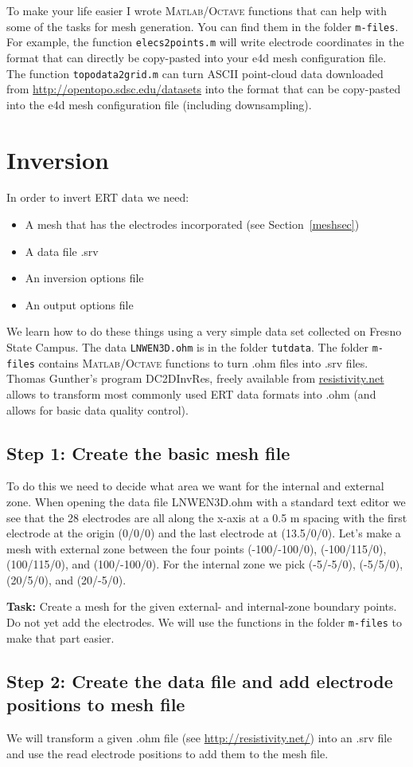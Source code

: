\documentclass[11pt]{article}
\begin{document}
To make your life easier I wrote \textsc{Matlab}/\textsc{Octave}
functions that can help with some of the tasks for mesh
generation. You can find them in the folder \verb+m-files+. For
example, the function \verb+elecs2points.m+ will write electrode
coordinates in the format that can directly be copy-pasted into your
e4d mesh configuration file. The function \verb+topodata2grid.m+ can
turn ASCII point-cloud data downloaded from
\url{http://opentopo.sdsc.edu/datasets} into the format that can be
copy-pasted into the e4d mesh configuration file (including
downsampling).


\section{Inversion}

In order to invert ERT data we need:

\begin{itemize}
\item A mesh that has the electrodes incorporated (see Section~\ref{meshsec})
\item A data file .srv
\item An inversion options file
\item An output options file
\end{itemize}

We learn how to do these things using a very simple data set collected on Fresno State Campus. The data \verb+LNWEN3D.ohm+ is in the folder \verb+tutdata+. The folder \verb+m-files+ contains \textsc{Matlab}/\textsc{Octave} functions to turn .ohm files into .srv files. Thomas Gunther's program DC2DInvRes, freely available from \url{resistivity.net} allows to transform most commonly used ERT data formats into .ohm (and allows for basic data quality control).

\subsection{Step 1: Create the basic mesh file}
To do this we need to decide what area we want for the internal and external zone. When opening the data file LNWEN3D.ohm with a standard text editor we see that the 28 electrodes are all along the x-axis at a 0.5 m spacing with the first electrode at the origin (0/0/0) and the last electrode at (13.5/0/0). Let's make a mesh with external zone between the four points (-100/-100/0), (-100/115/0), (100/115/0), and (100/-100/0). For the internal zone we pick (-5/-5/0), (-5/5/0), (20/5/0), and (20/-5/0).

\textbf{Task:} Create a mesh for the given external- and internal-zone boundary points. Do not yet add the electrodes. We will use the functions in the folder \verb+m-files+ to make that part easier.



\subsection{Step 2: Create the data file and add electrode positions to mesh file}

We will transform a given .ohm file (see \url{http://resistivity.net/}) into an .srv file and use the read electrode positions to add them to the mesh file.
\end{document}
